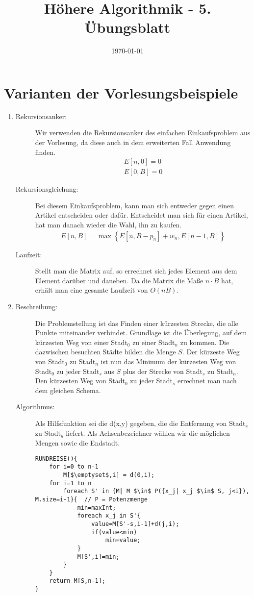 \documentclass[a4paper,10pt]{article}
\title{H\"ohere Algorithmik - 5. \"Ubungsblatt}
\author{\Authors}
\date{\today}
\begin{document}
\maketitle

\section{Varianten der Vorlesungsbeispiele}
\begin{enumerate}
	\item \begin{description}
		\item[Rekursionsanker:] Wir verwenden die Rekursionsanker des einfachen Einkaufsproblem aus der Vorlesung, da diese auch in dem erweiterten Fall Anwendung finden.\begin{align*}
			E[n, 0] = 0\\
			E[0, B] = 0
		\end{align*}
		\item[Rekursionsgleichung:] Bei diesem Einkaufsproblem, kann man sich entweder gegen einen Artikel entscheiden oder dafür. Entscheidet man sich für einen Artikel, hat man danach wieder die Wahl, ihn zu kaufen.\begin{align*}
			E[n, B] = \max\left\{E[n, B-p_n] + w_n, E[n-1, B]\right\}
		\end{align*}
		\item[Laufzeit:] Stellt man die Matrix auf, so errechnet sich jedes Element aus dem Element darüber und daneben. Da die Matrix die Maße $n\cdot B$ hat, erhält man eine gesamte Laufzeit von $O(nB)$.
	\end{description}
	\item \begin{description}
		\item[Beschreibung:] Die Problemstellung ist das Finden einer kürzesten Strecke, die alle Punkte miteinander verbindet. Grundlage ist die Überlegung, auf dem kürzesten Weg von einer Stadt$_0$ zu einer Stadt$_n$ zu kommen. Die dazwischen besuchten Städte bilden die Menge $S$. Der kürzeste Weg von Stadt$_0$ zu Stadt$_n$ ist nun das Minimum der kürzesten Weg von Stadt$_0$ zu jeder Stadt$_s$ aus $S$ plus der Strecke von Stadt$_s$ zu Stadt$_n$. Den kürzesten Weg von Stadt$_0$ zu jeder Stadt$_s$ errechnet man nach dem gleichen Schema.
		\item[Algorithmus:] Als Hilfsfunktion sei die d(x,y) gegeben, die die Entfernung von Stadt$_x$ zu Stadt$_y$ liefert. Als Achsenbezeichner wählen wir die möglichen Mengen sowie die Endstadt.
			\begin{lstlisting}[language=Clean,mathescape=true]
RUNDREISE(){
	for i=0 to n-1
		M[$\emptyset$,i] = d(0,i);
	for i=1 to n
		foreach S' in {M| M $\in$ P({x_j| x_j $\in$ S, j<i}), M.size=i-1}{  // P = Potenzmenge
			min=maxInt;
			foreach x_j in S'{
				value=M[S'-s,i-1]+d(j,i);
				if(value<min)
					min=value;
			}
			M[S',i]=min;
		}
	}
	return M[S,n-1];
}
		\end{lstlisting}
	\end{description}
\end{enumerate}
\end{document}
